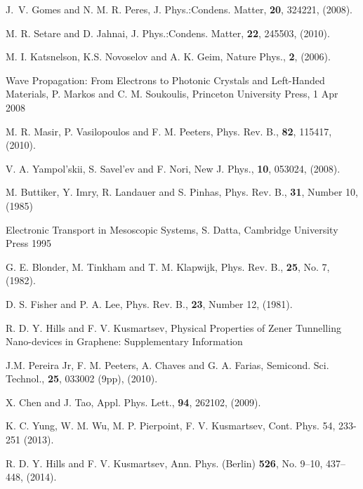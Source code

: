 \documentclass[prl,twocolumn,aps,superscriptaddress,floatfix,10pt]{revtex4}
\begin{document}
\begin{thebibliography}{10}
J.~V. Gomes and N. M. R. Peres,
\newblock J. Phys.:Condens. Matter, {\bf 20}, 324221, (2008).

M. R. Setare and D. Jahnai,
\newblock J. Phys.:Condens. Matter, {\bf 22}, 245503, (2010).

M. I. Katsnelson, K.S. Novoselov and A. K. Geim,
\newblock Nature Phys., {\bf 2}, (2006).

Wave Propagation: From Electrons to Photonic Crystals and Left-Handed Materials,
P. Markos and C. M. Soukoulis,
\newblock Princeton University Press, 1 Apr 2008

M. R. Masir, P. Vasilopoulos and F. M. Peeters,
\newblock Phys. Rev. B., {\bf 82}, 115417, (2010).

V. A. Yampol'skii, S. Savel'ev and F. Nori,
\newblock New J. Phys., {\bf 10}, 053024, (2008).

M. Buttiker, Y. Imry, R. Landauer and S. Pinhas,
\newblock Phys. Rev. B., {\bf 31}, Number 10, (1985)

Electronic Transport in Mesoscopic Systems, 
S. Datta, 
Cambridge University Press 1995

G. E. Blonder, M. Tinkham and T. M. Klapwijk,
Phys. Rev. B., {\bf 25}, No. 7, (1982).

D. S. Fisher and P. A. Lee,
\newblock Phys. Rev. B., {\bf 23}, Number 12, (1981).

R. D. Y. Hills and F. V. Kusmartsev,
Physical Properties of Zener Tunnelling Nano-devices in Graphene: Supplementary Information

J.M. Pereira Jr, F. M. Peeters, A. Chaves and G. A. Farias,
\newblock Semicond. Sci. Technol., {\bf 25}, 033002 (9pp), (2010).

X. Chen and J. Tao,
\newblock Appl. Phys. Lett., {\bf 94}, 262102, (2009).

 K. C. Yung, W. M. Wu, M. P. Pierpoint, F. V. Kusmartsev,
Cont. Phys. 54, 233-251 (2013).   

 R. D. Y. Hills and F. V. Kusmartsev,
Ann. Phys. (Berlin) {\bf 526}, No. 9–10, 437–448, (2014).

\end{thebibliography}
\end{document}
